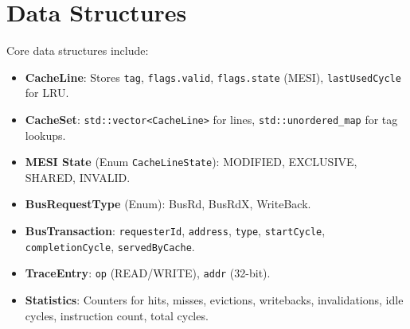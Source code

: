 \documentclass[11pt]{article}
\begin{document}
\section{Data Structures}

Core data structures include:
\begin{itemize}
    \item \textbf{CacheLine}: Stores \texttt{tag}, \texttt{flags.valid}, \texttt{flags.state} (MESI), \texttt{lastUsedCycle} for LRU.
    \item \textbf{CacheSet}: \texttt{std::vector<CacheLine>} for lines, \texttt{std::unordered_map} for tag lookups.
    \item \textbf{MESI State} (Enum \texttt{CacheLineState}): MODIFIED, EXCLUSIVE, SHARED, INVALID.
    \item \textbf{BusRequestType} (Enum): BusRd, BusRdX, WriteBack.
    \item \textbf{BusTransaction}: \texttt{requesterId}, \texttt{address}, \texttt{type}, \texttt{startCycle}, \texttt{completionCycle}, \texttt{servedByCache}.
    \item \textbf{TraceEntry}: \texttt{op} (READ/WRITE), \texttt{addr} (32-bit).
    \item \textbf{Statistics}: Counters for hits, misses, evictions, writebacks, invalidations, idle cycles, instruction count, total cycles.
\end{itemize}
\end{document}
